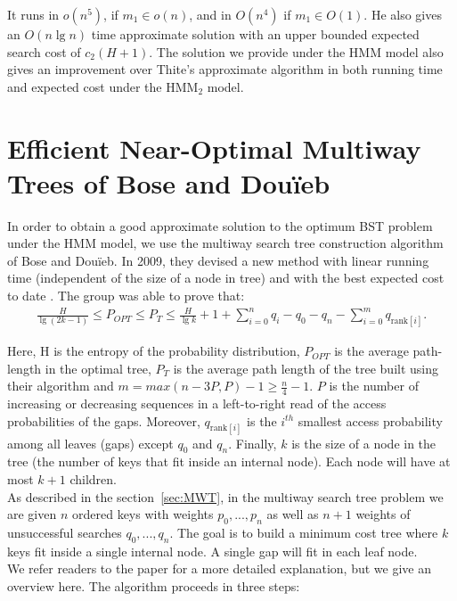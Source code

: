 \documentclass[letterpaper,12pt,titlepage,oneside,final]{book}
\theoremstyle{plain}
\begin{document}
It runs in $o(n^5)$, if $m_1 \in o(n)$, and in $O(n^4)$ if $m_1 \in O(1)$. He also gives an $O(n\lg n)$ time approximate solution with an upper bounded expected search cost of $c_2(H+1)$. The solution we provide under the HMM model also gives an improvement over Thite's approximate algorithm in both running time and expected cost under the HMM$_2$ model.


\section{Efficient Near-Optimal Multiway Trees of Bose and Dou\"{i}eb}\label{43}

In order to obtain a good approximate solution to the optimum BST problem under the HMM model, we use the multiway search tree construction algorithm of Bose and Dou\"{i}eb. In 2009, they devised a new method with linear running time (independent of the size of a node in tree) and with the best expected cost to date \cite{bose2009efficient}. The group was able to prove that:
\begin{align*}
\frac{H}{\lg(2k-1)} \leq P_{OPT} \leq P_T \leq \frac{H}{\lg k} + 1 + \sum_{i=0}^n q_i - q_0 - q_n - \sum_{i=0}^m q_{\text{rank}[i]}.
\end{align*}

Here, H is the entropy of the probability distribution, $P_{OPT}$ is the average path-length in the optimal tree, $P_T$ is the average path length of the tree built using their algorithm and $m=max({n-3P,P})-1 \geq \frac{n}{4} - 1$. $P$ is the number of increasing or decreasing sequences in a left-to-right read of the access probabilities of the gaps. Moreover, $q_{\text{rank}[i]}$ is the $i^{th}$ smallest access probability among all leaves (gaps) except $q_0$ and $q_n$. Finally, $k$ is the size of a node in the tree (the number of keys that fit inside an internal node). Each node will have at most $k+1$ children. \\

As described in the section~\ref{sec:MWT}, in the multiway search tree problem we are given $n$ ordered keys with weights $p_0, ..., p_n$ as well as $n+1$ weights of unsuccessful searches $q_0,...,q_n$. The goal is to build a minimum cost tree where $k$ keys fit inside a single internal node. A single gap will fit in each leaf node. \\
 
We refer readers to the paper \cite{bose2009efficient} for a more detailed explanation, but we give an overview here. The algorithm proceeds in three steps: 
 
\end{document}

